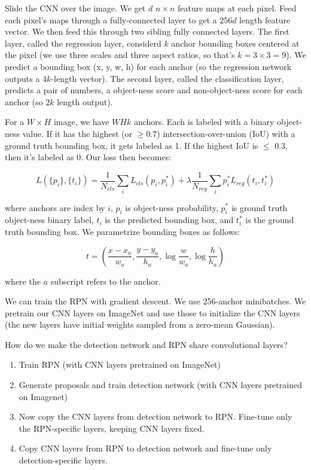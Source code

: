 \documentclass[a4paper]{article}
\begin{document}
Slide the CNN over the image. We get $d$ $n \times n$ feature maps at each
pixel. Feed each pixel's maps through a fully-connected layer to get a $256d$
length feature vector. We then feed this through two sibling fully connected
layers. The first layer, called the regression layer, considerd $k$ anchor
bounding boxes centered at the pixel (we use three scales and three aspect
ratios, so that's $k = 3 \times 3 = 9$). We predict a bounding box (x, y, w, h)
for each anchor (so the regression network outputs a $4k$-length vector).
The second layer, called the classification layer, predicts a pair of numbers,
a object-ness score and non-object-ness score for each anchor (so $2k$ length
output).

For a $W \times H$ image, we have $WHk$ anchors. Each is labeled with a binary
object-ness value. If it has the highest (or $\geq 0.7$) intersection-over-union
(IoU) with a ground truth bounding box, it gets labeled as 1. If the highest
IoU is $\leq$ 0.3, then it's labeled as 0. Our loss then becomes:

$$
L(\{p_i\}, \{t_i\}) = \frac{1}{N_{cls}} \sum_{i}{
L_{cls}(p_i, p_i^*)
} + \lambda \frac{1}{N_{reg}} \sum_{i}{
p_i^* L_{reg}(t_i, t_i^*)
}
$$

where anchors are index by $i$, $p_i$ is object-ness probability, $p_i^*$ is
ground truth object-ness binary label, $t_i$ is the predicted bounding box,
and $t_i^*$ is the ground truth bounding box. We parametrize bounding boxes
as follows:

$$
t = (\frac{x - x_a}{w_a}, \frac{y - y_a}{h_a}, \log \frac{w}{w_a}, \log
\frac{h}{h_a})
$$

where the $a$ subscript refers to the anchor.

We can train the RPN with gradient descent. We use 256-anchor minibatches.
We pretrain our CNN layers on ImageNet and use those to initialize the CNN
layers (the new layers have initial weights sampled from a zero-mean Gaussian).

How do we make the detection network and RPN share convolutional layers?

\begin{enumerate}
  \item Train RPN (with CNN layers pretrained on ImageNet)
  \item Generate proposals and train detection network (with CNN layers
    pretrained on Imagenet)
  \item Now copy the CNN layers from detection network to RPN. Fine-tune only
    the RPN-specific layers, keeping CNN layers fixed.
  \item Copy CNN layers from RPN to detection network and fine-tune only
    detection-specific layers.
\end{enumerate}
\end{document}
